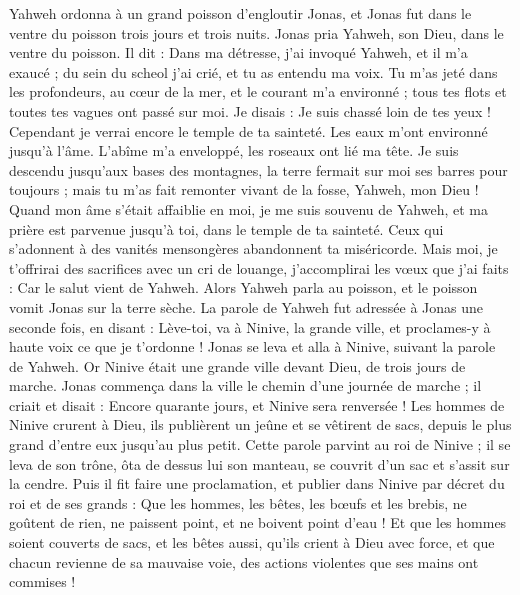 \begin{multicols}{2}
Yahweh ordonna à un grand poisson d'engloutir Jonas, et Jonas fut dans le ventre du poisson trois jours et trois nuits.
\VerseOne{}Jonas pria Yahweh, son Dieu, dans le ventre du poisson.
Il dit : Dans ma détresse, j'ai invoqué Yahweh, et il m'a exaucé ; du sein du scheol j'ai crié, et tu as entendu ma voix.
Tu m'as jeté dans les profondeurs, au cœur de la mer, et le courant m'a environné ; tous tes flots et toutes tes vagues ont passé sur moi.
Je disais : Je suis chassé loin de tes yeux ! Cependant je verrai encore le temple de ta sainteté.
Les eaux m'ont environné jusqu'à l'âme. L'abîme m'a enveloppé, les roseaux ont lié ma tête.
Je suis descendu jusqu'aux bases des montagnes, la terre fermait sur moi ses barres pour toujours ; mais tu m'as fait remonter vivant de la fosse, Yahweh, mon Dieu !
Quand mon âme s'était affaiblie en moi, je me suis souvenu de Yahweh, et ma prière est parvenue jusqu'à toi, dans le temple de ta sainteté.
Ceux qui s'adonnent à des vanités mensongères abandonnent ta miséricorde.
Mais moi, je t'offrirai des sacrifices avec un cri de louange, j'accomplirai les vœux que j'ai faits : Car le salut vient de Yahweh.
Alors Yahweh parla au poisson, et le poisson vomit Jonas sur la terre sèche.
\VerseOne{}La parole de Yahweh fut adressée à Jonas une seconde fois, en disant :
Lève-toi, va à Ninive, la grande ville, et proclames-y à haute voix ce que je t'ordonne !
Jonas se leva et alla à Ninive, suivant la parole de Yahweh. Or Ninive était une grande ville devant Dieu, de trois jours de marche.
Jonas commença dans la ville le chemin d'une journée de marche ; il criait et disait : Encore quarante jours, et Ninive sera renversée !
Les hommes de Ninive crurent à Dieu, ils publièrent un jeûne et se vêtirent de sacs, depuis le plus grand d'entre eux jusqu'au plus petit.
Cette parole parvint au roi de Ninive ; il se leva de son trône, ôta de dessus lui son manteau, se couvrit d'un sac et s'assit sur la cendre.
Puis il fit faire une proclamation, et publier dans Ninive par décret du roi et de ses grands : Que les hommes, les bêtes, les bœufs et les brebis, ne goûtent de rien, ne paissent point, et ne boivent point d'eau !
Et que les hommes soient couverts de sacs, et les bêtes aussi, qu'ils crient à Dieu avec force, et que chacun revienne de sa mauvaise voie, des actions violentes que ses mains ont commises !

\end{multicols}
